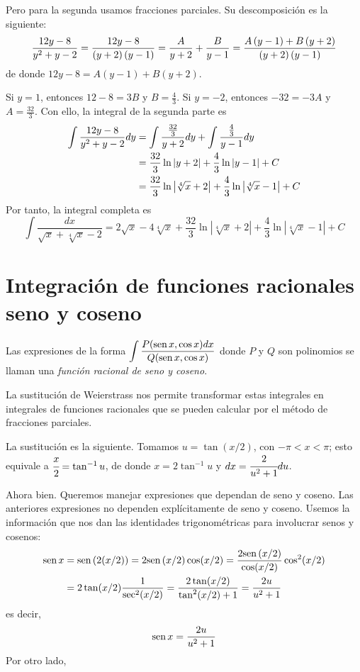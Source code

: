 Pero para la segunda usamos fracciones parciales. Su descomposición es la siguiente:
{\small
\[
\frac{12y-8}{y^{2}+y-2}=\frac{12y-8}{\left( y+2\right) \left( y-1\right) }=%
\frac{A}{y+2}+\frac{B}{y-1}=\frac{A\left( y-1\right) +B\left( y+2\right) }{%
\left( y+2\right) \left( y-1\right) }
\]
}
de donde $12y-8=A\left( y-1\right) +B\left( y+2\right)$.

Si $y=1$, entonces $12-8=3B$ y $B=\frac{4}{3}$. Si $y=-2$, entonces $-32=-3A$ y $A=\frac{32}{3}$. Con ello, la integral de la segunda parte es
\begin{align*}
 \int \frac{12y-8}{y^{2}+y-2}dy&=\int \frac{\frac{32}{3}}{y+2}dy+\int \frac{%
\frac{4}{3}}{y-1}dy \\
 &=\frac{32}{3}\ln \left\vert y+2\right\vert +\frac{4}{3}%
\ln \left\vert y-1\right\vert +C \\
 &=\frac{32}{3}\ln \left\vert \sqrt[4]{x}+2\right\vert +\frac{4}{3}\ln
\left\vert \sqrt[4]{x}-1\right\vert +C
\end{align*}
Por tanto, la integral completa es
\[
\int \frac{dx}{\sqrt{x}+\sqrt[4]{x}-2}=2\sqrt{x}-4\sqrt[4]{x}+\frac{32}{3}\ln \left\vert \sqrt[4]{x}+2\right\vert +\frac{4}{3}\ln
\left\vert \sqrt[4]{x}-1\right\vert +C
\]

\section{Integración de funciones racionales seno y coseno}

Las expresiones de la forma {\small $\displaystyle\int \frac{P(\text{\rm sen}\, x,\cos x)dx}{Q(\text{\rm sen}\, x,\cos x)}$} donde $P$ y $Q$ son polinomios se llaman una \textit{función racional de seno y coseno}.

La sustitución de Weierstrass nos permite transformar estas integrales en integrales de funciones racionales que se pueden calcular por el método de fracciones parciales.

La sustitución es la siguiente. Tomamos $u=\tan \left(x/2\right)$, con $-\pi<x<\pi$; esto equivale a $\cfrac{x}{2}=\tan^{-1} u$, de donde $x=2\tan^{-1} u$ y $dx=\cfrac{2}{u^{2}+1}du$.

Ahora bien. Queremos manejar expresiones que dependan de seno y coseno. Las anteriores expresiones no dependen explícitamente de seno y coseno. Usemos la información que nos dan las identidades trigonométricas para involucrar senos y cosenos:
\begin{align*}
\text{\rm sen}\, x&=\text{\rm sen}\, (2(x/2)) =2\text{\rm sen}\, (x/2)\cos (x/2) =\frac{2\text{\rm sen}\, (x/2)}{\cos (x/2)}\cos^2(x/2) \\
&=2\tan (x/2)\frac{1}{\sec ^{2}(x/2)} =\frac{2\tan (x/2)}{\tan ^{2}(x/2)+1} =\frac{2u}{u^{2}+1}
\end{align*}
es decir,
\begin{equation}\label{Senox/2}
\text{\rm sen}\, x=\frac{2u}{u^{2}+1}
\end{equation}
Por otro lado,

